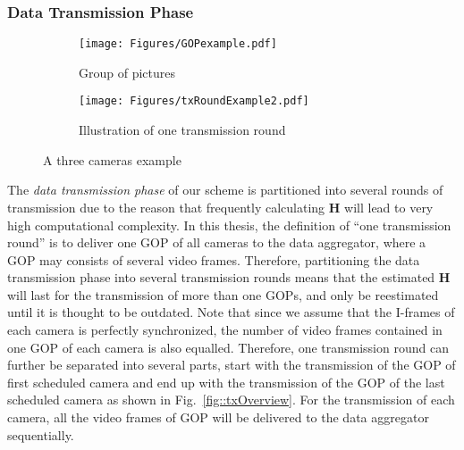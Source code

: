 {\subsubsection{Data Transmission Phase}
\label{sec::dataTransmissionPhase}
\begin{figure}
\begin{center}
\begin{subfigure}[b]{0.65\columnwidth}
\texttt{[image: Figures/GOPexample.pdf]}
\caption{\label{fig::txRoundExampleGOP}Group of pictures}
\end{subfigure}
\begin{subfigure}[b]{0.95\columnwidth}
\texttt{[image: Figures/txRoundExample2.pdf]}
\caption{\label{fig::txRoundExampleTx}Illustration of one transmission round}
\end{subfigure}
\caption{\label{fig::txRoundExample}A three cameras example}
\end{center}
\end{figure}
The \emph{data transmission phase} of our scheme is partitioned into several rounds of transmission due to the reason that frequently calculating $\mathbf{H}$ will lead to very high computational complexity.
In this thesis, the definition of ``one transmission round'' is to deliver one GOP of all cameras to the data aggregator, where a GOP may consists of several video frames.
Therefore, partitioning the data transmission phase into several transmission rounds means that the estimated $\mathbf{H}$ will last for the transmission of more than one GOPs, and only be reestimated until it is thought to be outdated.
Note that since we assume that the I-frames of each camera is perfectly synchronized, the number of video frames contained in one GOP of each camera is also equalled.
Therefore, one transmission round can further be separated into several parts, start with the transmission of the GOP of first scheduled camera and end up with the transmission of the GOP of the last scheduled camera as shown in Fig.~\ref{fig::txOverview}.
For the transmission of each camera, all the video frames of GOP will be delivered to the data aggregator sequentially.

}
